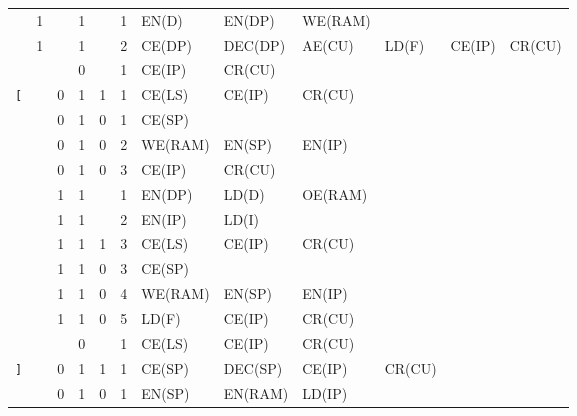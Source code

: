 \begin{landscape}
\begin{longtable}[c] {c|cccc|c|llllll}
    \rowcolor{Gray}              & 1 &   & 1     &      & 1     & EN(D)  & EN(DP)  & WE(RAM) &        &                 \\
    \rowcolor{Gray}              & 1 &   & 1     &      & 2     & CE(DP) & DEC(DP) & AE(CU)  & LD(F)  & CE(IP) & CR(CU) \\
    \rowcolor{White}             &   &   & 0     &      & 1     & CE(IP) & CR(CU)  &         &        &        &        \\ \hline
    \rowcolor{Gray}  \texttt{[}  &   & 0 & 1     & 1    & 1     & CE(LS) & CE(IP)  & CR(CU)  &        &        &        \\
    \rowcolor{White}             &   & 0 & 1     & 0    & 1     & CE(SP) &         &         &        &        &        \\
    \rowcolor{White}             &   & 0 & 1     & 0    & 2     & WE(RAM)& EN(SP)  & EN(IP)  &        &        &        \\
    \rowcolor{White}             &   & 0 & 1     & 0    & 3     & CE(IP) & CR(CU)  &         &        &        &        \\
    \rowcolor{Gray}              &   & 1 & 1     &      & 1     & EN(DP) & LD(D)   & OE(RAM) &        &        &        \\
    \rowcolor{Gray}              &   & 1 & 1     &      & 2     & EN(IP) & LD(I)   &         &        &        &        \\
    \rowcolor{Gray}              &   & 1 & 1     & 1    & 3     & CE(LS)  & CE(IP) & CR(CU)  &        &        &        \\
    \rowcolor{White}             &   & 1 & 1     & 0    & 3     & CE(SP)  &        &         &        &        &        \\
    \rowcolor{White}             &   & 1 & 1     & 0    & 4     & WE(RAM) & EN(SP) & EN(IP)  &        &        &        \\
    \rowcolor{White}             &   & 1 & 1     & 0    & 5     & LD(F)   & CE(IP) & CR(CU)  &        &        &        \\ 
    \rowcolor{Gray}              &   &   & 0     &      & 1     & CE(LS)  & CE(IP) & CR(CU)  &        &        &        \\ \hline
    \rowcolor{White} \texttt{]}  &   & 0 & 1     & 1    & 1     & CE(SP)  & DEC(SP)& CE(IP)  & CR(CU) &        &        \\
    \rowcolor{Gray}              &   & 0 & 1     & 0    & 1     & EN(SP)  & EN(RAM)& LD(IP)  &        &        &        \\

\end{longtable}
\end{landscape}
